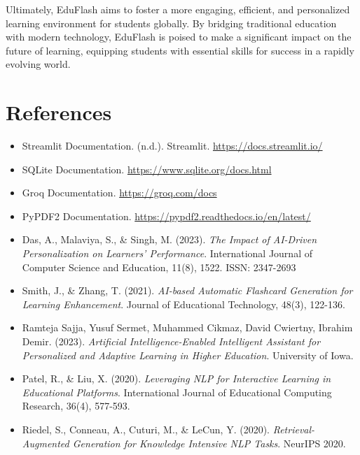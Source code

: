 \documentclass{report}
\begin{document}
Ultimately, EduFlash aims to foster a more engaging, efficient, and personalized learning environment for students globally. By bridging traditional education with modern technology, EduFlash is poised to make a significant impact on the future of learning, equipping students with essential skills for success in a rapidly evolving world.


\chapter{References}
\begin{itemize}
    \item Streamlit Documentation. (n.d.). Streamlit. \url{https://docs.streamlit.io/}
    \item SQLite Documentation. \url{https://www.sqlite.org/docs.html}
    \item Groq Documentation. \url{https://groq.com/docs}
    \item PyPDF2 Documentation. \url{https://pypdf2.readthedocs.io/en/latest/}
    \item Das, A., Malaviya, S., \& Singh, M. (2023). \textit{The Impact of AI-Driven Personalization on Learners' Performance}. International Journal of Computer Science and Education, 11(8), 1522. ISSN: 2347-2693
    \item Smith, J., \& Zhang, T. (2021). \textit{AI-based Automatic Flashcard Generation for Learning Enhancement}. Journal of Educational Technology, 48(3), 122-136.
    \item Ramteja Sajja, Yusuf Sermet, Muhammed Cikmaz, David Cwiertny, Ibrahim Demir. (2023). \textit{Artificial Intelligence-Enabled Intelligent Assistant for Personalized and Adaptive Learning in Higher Education}. University of Iowa.
    \item Patel, R., \& Liu, X. (2020). \textit{Leveraging NLP for Interactive Learning in Educational Platforms}. International Journal of Educational Computing Research, 36(4), 577-593.
    \item Riedel, S., Conneau, A., Cuturi, M., \& LeCun, Y. (2020). \textit{Retrieval-Augmented Generation for Knowledge Intensive NLP Tasks}. NeurIPS 2020.
\end{itemize}
\end{document}
